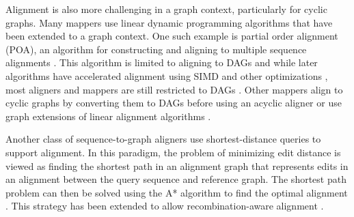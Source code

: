 \documentclass[11pt]{ucscthesis}
\begin{document}



Alignment is also more challenging in a graph context, particularly for cyclic graphs.
Many mappers use linear dynamic programming algorithms that have been extended to a graph context.
One such example is partial order alignment (POA), an algorithm for constructing and aligning to multiple sequence alignments \cite{lee_poa_2002}.
This algorithm is limited to aligning to DAGs and while later algorithms have accelerated alignment using SIMD and other optimizations \cite{jain_accelerating_2019,gao_abpoa_2021,darby_vargas_2020}, most aligners and mappers are still restricted to DAGs \cite{kim_hisat2_2019,rakocevic_fast_2019,li_minigraph_2020,ma_graphchainer_2023}.
Other mappers align to cyclic graphs by converting them to DAGs before using an acyclic aligner \cite{garrison_vg_2018} or use graph extensions of linear alignment algorithms \cite{rautiainen_bit-parallel_2019,zhang_fast_2022}. 

Another class of sequence-to-graph aligners use shortest-distance queries to support alignment.
In this paradigm, the problem of minimizing edit distance is viewed as finding the shortest path in an alignment graph that represents edits in an alignment between the query sequence and reference graph.
The shortest path problem can then be solved using the A* algorithm to find the optimal alignment \cite{ivanov_astarix_2020,bonizzoni_recalign_2025}.
This strategy has been extended to allow recombination-aware alignment \cite{bonizzoni_recalign_2025}.
\end{document}
